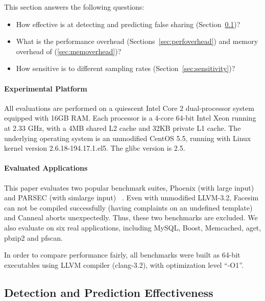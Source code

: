 \label{sec:evaluation}

This section answers the following questions:
\begin{itemize}
\item
  How effective is \Predator{} at detecting and predicting false sharing (Section~\ref{sec:effective})?

\item
  What is the performance overhead (Sections~\ref{sec:perfoverhead}) and memory overhead of \Predator{} (\ref{sec:memoverhead})?

\item 
  How sensitive is \Predator{} to different sampling rates (Section~\ref{sec:sensitivity})? 
 
\end{itemize}

\paragraph{Experimental Platform} All evaluations are performed on a quiescent Intel Core 2 dual-processor system equipped with 
16GB RAM. Each processor is a 4-core 64-bit Intel Xeon running at 2.33 GHz, with a 4MB shared L2 cache and 32KB private L1 cache. The underlying operating system is an unmodified CentOS 5.5, running with Linux kernel version 2.6.18-194.17.1.el5. The glibc version is 2.5. %

\paragraph{Evaluated Applications} 
This paper evaluates two popular benchmark suites,
Phoenix (with large input) ~\cite{phoenix-hpca} and PARSEC (with simlarge input) ~\cite{parsec}. Even with unmodified LLVM-3.2, Facesim can not be compiled successfully (having complaints on an undefined template) and Canneal aborts unexpectedly. Thus, these two benchmarks are excluded.
We also evaluate \Predator{} on six real applications, including MySQL, Boost, Memcached, aget, pbzip2 and pfscan.

In order to compare performance fairly, all benchmarks were built as 64-bit executables using LLVM compiler (clang-3.2), with optimization level ``-O1''.

\subsection{Detection and Prediction Effectiveness}
\label{sec:effective}

